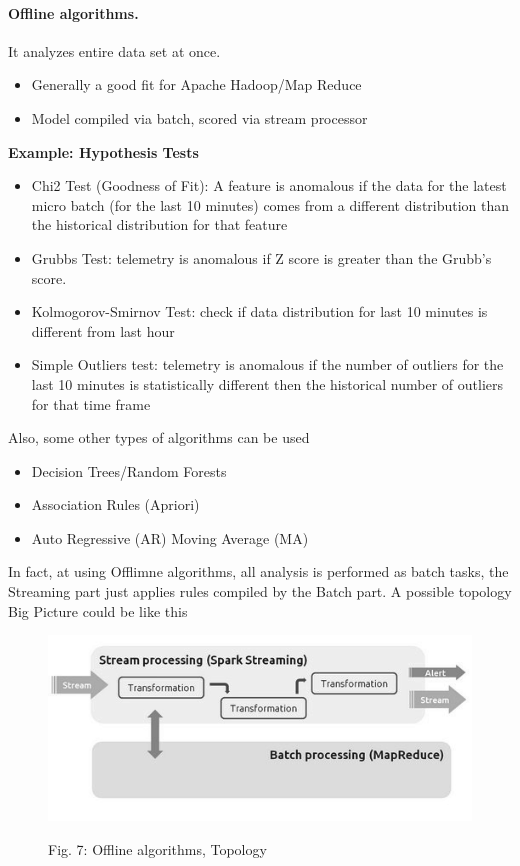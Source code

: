 \documentclass[10pt, a5paper]{article}
\begin{document}
\paragraph{Offline algorithms.}

It analyzes entire data set at once.

\begin{itemize}
  \item Generally a good fit for Apache Hadoop/Map Reduce
  \item Model compiled via batch, scored via stream processor
\end{itemize}

\textbf{Example: Hypothesis Tests}

\begin{itemize}
  \item Chi2 Test (Goodness of Fit): A feature is anomalous if the data for the latest micro batch (for the last 10 minutes) comes
from a different distribution than the historical distribution for that feature
  \item Grubbs Test: telemetry is anomalous if Z score is greater than the Grubb's score.
  \item Kolmogorov-Smirnov Test: check if data distribution for last 10 minutes is different from last hour
  \item Simple Outliers test: telemetry is anomalous if the number of outliers for the last 10 minutes is statistically different then the
historical number of outliers for that time frame
\end{itemize}

Also, some other types of algorithms can be used

\begin{itemize}
  \item Decision Trees/Random Forests
  \item Association Rules (Apriori)
  \item Auto Regressive (AR) Moving Average (MA)
\end{itemize}

In fact, at using Offlimne algorithms, all analysis is performed as batch tasks, the Streaming part just applies rules compiled by the Batch part. A possible topology Big Picture could be like this
\begin{figure}[h!]
  \centering 
  \includegraphics[scale=0.8]{16_2015_fig7}
  
  Fig. 7: Offline algorithms, Topology
\end{figure}
\end{document}
